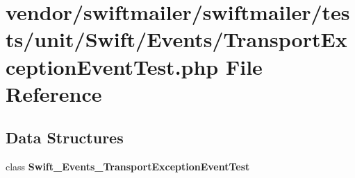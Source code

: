 \section{vendor/swiftmailer/swiftmailer/tests/unit/\+Swift/\+Events/\+Transport\+Exception\+Event\+Test.php File Reference}
\label{_transport_exception_event_test_8php}
\subsection*{Data Structures}
\begin{DoxyCompactItemize}
\item 
class {\bf Swift\+\_\+\+Events\+\_\+\+Transport\+Exception\+Event\+Test}
\end{DoxyCompactItemize}
